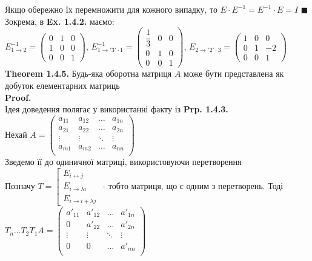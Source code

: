 \documentclass[a4paper, 10pt]{article}
\def\th#1{\textbf{Theorem {#1}}}
\def\proof{\textbf{Proof.}\\}
\def\qed{$\blacksquare$}
\theoremstyle{theoremdd}
\theoremstyle{theoremdd}
\theoremstyle{theoremdd}
\theoremstyle{theoremdd}
\theoremstyle{theoremdd}
\theoremstyle{theoremdd}
\theoremstyle{theoremdd}
\theoremstyle{theoremdd}
\begin{document}
	Якщо обережно їх перемножити для кожного випадку, то $E \cdot E^{-1} = E^{-1} \cdot E = I$ \qed
	\bigskip \\
	Зокрема, в \textbf{Ex. 1.4.2.} маємо:\\
	$E_{1 \rightarrow 2}^{-1} = \begin{pmatrix}
	0 & 1 & 0 \\
	1 & 0 & 0 \\
	0 & 0 & 1
	\end{pmatrix}$, $E_{1 \rightarrow '3' \cdot 1}^{-1} = \begin{pmatrix}
	\dfrac{1}{3} & 0 & 0 \\
	0 & 1 & 0 \\
	0 & 0 & 1
	\end{pmatrix}$, $E_{2 \rightarrow '2'\cdot 3} = \begin{pmatrix}
	1 & 0 & 0 \\
	0 & 1 & -2 \\
	0 & 0 & 1
	\end{pmatrix}$
	\bigskip \\
	\th{1.4.5.} Будь-яка оборотна матриця $A$ може бути представлена як добуток елементарних матриць\\
	\proof
	Ідея доведення полягає у використанні факту із \textbf{Prp. 1.4.3.}\\
	Нехай
	$A = \begin{pmatrix}
	a_{11} & a_{12} & \dots & a_{1n} \\
	a_{21} & a_{22} & \dots & a_{2n} \\
	\vdots & \vdots & \ddots & \vdots \\
	a_{m1} & a_{m2} & \dots & a_{nn} \\
	\end{pmatrix}$ \\ Зведемо її до одиничної матриці, використовуючи перетворення\\
	Позначу $T = \left[ \begin{gathered} E_{i \leftrightarrow j} \\ E_{i \rightarrow \lambda i} \\ E_{i \rightarrow i + \lambda j} \end{gathered} \right.$ - тобто матриця, що є одним з перетворень. Тоді\\
	$T_n \dots T_2 T_1 A = \begin{pmatrix}
	a'_{11} & a'_{12} & \dots & a'_{1n} \\
	0 & a'_{22} & \dots & a'_{2n} \\
	\vdots & \vdots & \ddots & \vdots \\
	0 & 0 & \dots & a'_{nn} \\
	\end{pmatrix}$\\
\end{document}
